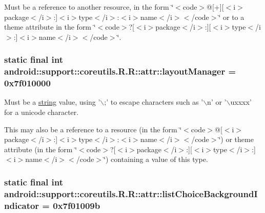 Must be a reference to another resource, in the form \char`\"{}$<$code$>$@\mbox{[}+\mbox{]}\mbox{[}$<$i$>$package$<$/i$>$:\mbox{]}$<$i$>$type$<$/i$>$:$<$i$>$name$<$/i$>$$<$/code$>$\char`\"{} or to a theme attribute in the form \char`\"{}$<$code$>$?\mbox{[}$<$i$>$package$<$/i$>$:\mbox{]}\mbox{[}$<$i$>$type$<$/i$>$:\mbox{]}$<$i$>$name$<$/i$>$$<$/code$>$\char`\"{}. \hypertarget{classandroid_1_1support_1_1coreutils_1_1_r_1_1attr_f3f01febda4258b4b30ca2ce8405e977}{
\subsubsection[{layoutManager}]{\setlength{\rightskip}{0pt plus 5cm}static final int android::support::coreutils.R.R::attr::layoutManager = 0x7f010000}}
\label{classandroid_1_1support_1_1coreutils_1_1_r_1_1attr_f3f01febda4258b4b30ca2ce8405e977}


Must be a \hyperlink{classandroid_1_1support_1_1coreutils_1_1_r_1_1string}{string} value, using '$\backslash$;' to escape characters such as '$\backslash$n' or '$\backslash$uxxxx' for a unicode character. 

This may also be a reference to a resource (in the form \char`\"{}$<$code$>$@\mbox{[}$<$i$>$package$<$/i$>$:\mbox{]}$<$i$>$type$<$/i$>$:$<$i$>$name$<$/i$>$$<$/code$>$\char`\"{}) or theme attribute (in the form \char`\"{}$<$code$>$?\mbox{[}$<$i$>$package$<$/i$>$:\mbox{]}\mbox{[}$<$i$>$type$<$/i$>$:\mbox{]}$<$i$>$name$<$/i$>$$<$/code$>$\char`\"{}) containing a value of this type. \hypertarget{classandroid_1_1support_1_1coreutils_1_1_r_1_1attr_2fd1182360c2ef7e5141dbdba4ca3787}{
\subsubsection[{listChoiceBackgroundIndicator}]{\setlength{\rightskip}{0pt plus 5cm}static final int android::support::coreutils.R.R::attr::listChoiceBackgroundIndicator = 0x7f01009b}}
\label{classandroid_1_1support_1_1coreutils_1_1_r_1_1attr_2fd1182360c2ef7e5141dbdba4ca3787}


